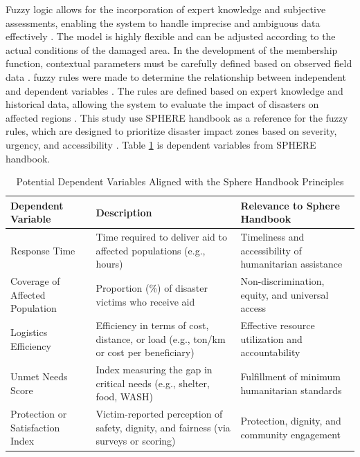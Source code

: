 \documentclass[conference,final,a4paper,twoside,10pt]{IEEEtran}
\begin{document}
Fuzzy logic allows for the incorporation of expert knowledge and subjective assessments, enabling the system to handle imprecise and ambiguous data effectively \cite{jain2020membership}. The model is highly flexible and can be adjusted according to the actual conditions of the damaged area. In the development of the membership function, contextual parameters must be carefully defined based on observed field data \cite{amiri2021application}. fuzzy rules were made to determine the relationship between independent and dependent variables \cite{yoon2023novel}. The rules are defined based on expert knowledge and historical data, allowing the system to evaluate the impact of disasters on affected regions \cite{wang2024gis}. This study use SPHERE handbook as a reference for the fuzzy rules, which are designed to prioritize disaster impact zones based on severity, urgency, and accessibility \cite{sphere2018pdf}. Table \ref{tab:dependent_variables_sphere} is dependent variables from SPHERE handbook.

\begin{table}[H]
\caption{Potential Dependent Variables Aligned with the Sphere Handbook Principles}
\begin{center}
\begin{tabular}{|p{2cm}|p{2cm}|p{2cm}|}
\hline
\textbf{Dependent Variable} & \textbf{Description} & \textbf{Relevance to Sphere Handbook} \\
\hline
Response Time & Time required to deliver aid to affected populations (e.g., hours) & Timeliness and accessibility of humanitarian assistance \\
\hline
Coverage of Affected Population & Proportion (\%) of disaster victims who receive aid & Non-discrimination, equity, and universal access \\
\hline
Logistics Efficiency & Efficiency in terms of cost, distance, or load (e.g., ton/km or cost per beneficiary) & Effective resource utilization and accountability \\
\hline
Unmet Needs Score & Index measuring the gap in critical needs (e.g., shelter, food, WASH) & Fulfillment of minimum humanitarian standards \\
\hline
Protection or Satisfaction Index & Victim-reported perception of safety, dignity, and fairness (via surveys or scoring) & Protection, dignity, and community engagement \\
\hline
\end{tabular}
\label{tab:dependent_variables_sphere}
\end{center}
\end{table}
\end{document}
